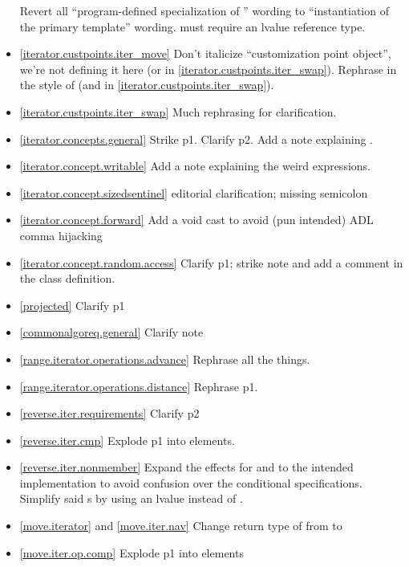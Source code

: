 \begin{itemize}
  Revert all ``program-defined specialization of '' wording
  to ``instantiation of the primary template'' wording.
   must require an lvalue reference
  type.
\item \ref{iterator.custpoints.iter_move} Don't italicize ``customization point
  object'', we're not defining it here
  (or in \ref{iterator.custpoints.iter_swap}). Rephrase in the style of
   (and in
  \ref{iterator.custpoints.iter_swap}).
\item \ref{iterator.custpoints.iter_swap} Much rephrasing for clarification.
\item \ref{iterator.concepts.general} Strike p1. Clarify p2.
  Add a note explaining .
\item \ref{iterator.concept.writable} Add a note explaining the weird
   expressions.
\item \ref{iterator.concept.sizedsentinel} editorial clarification;
  missing semicolon
\item \ref{iterator.concept.forward} Add a void cast to avoid (pun intended) ADL
  comma hijacking
\item \ref{iterator.concept.random.access} Clarify p1; strike note and add a
   comment in the class definition.
\item \ref{projected} Clarify p1
\item \ref{commonalgoreq.general} Clarify note
\item \ref{range.iterator.operations.advance} Rephrase all the things.
\item \ref{range.iterator.operations.distance} Rephrase p1.
\item \ref{reverse.iter.requirements} Clarify p2
\item \ref{reverse.iter.cmp} Explode p1 into \constraints elements.
\item \ref{reverse.iter.nonmember} Expand the effects for  and
   to the intended implementation to avoid confusion over the
  conditional  specifications. Simplify said s
  by using an lvalue  instead of .
\item \ref{move.iterator} and \ref{move.iter.nav} Change return type of
   from  to 
\item \ref{move.iter.op.comp} Explode p1 into \constraints elements

\end{itemize}
